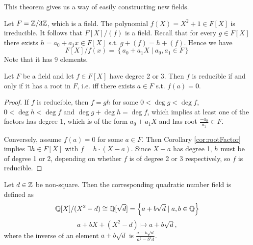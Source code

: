 This theorem gives us a way of easily constructing new fields.
\begin{example}
  Let $F=\mathbb Z/3\mathbb Z$, which is a field. The polynomial $f(X)=X^2+1\in F[X]$ is
  irreducible. It follows that $F[X]/(f)$ is a field. Recall that for every $g\in F[X]$
  there exists $h=a_0+a_1x\in F[X]$ s.t. $g+(f)=h+(f)$. Hence we have
  \[F[X]/f(x) = \left\{ a_0+a_1X \mid a_0,a_1\in F \right\}\]
  Note that it has 9 elements.
\end{example}
\begin{theorem}
  Let $F$ be a field and let $f\in F[X]$ have degree 2 or 3. Then $f$ is reducible if and
  only if it has a root in $F$, i.e. iff there exists $a\in F$ s.t. $f(a)=0$.
  \label{thm:deg2o3Root}
\end{theorem}
\begin{proof}
  If $f$ is reducible, then $f=gh$ for some $0<\deg g<\deg f$, $0<\deg h<\deg f$ and
  $\deg g + \deg h = \deg f$, which implies at least one of the factors has degree 1,
  which is of the form $a_0+a_1X$ and has root $\frac{-a_0}{a_1}\in F$.

  Conversely, assume $f(a)=0$ for some $a\in F$. Then Corollary \ref{cor:rootFactor} implies $\exists h\in F[X]$ with $f=h\cdot(X-a)$. Since $X-a$ has degree 1, $h$ must be of degree 1 or 2, depending on whether $f$ is of degree 2 or 3 respectively, so $f$ is reducible. 
\end{proof}


\begin{example}
  Let $d\in \mathbb Z$ be non-square. Then the corresponding quadratic number field is defined as
  \[\mathbb Q[X]/(X^2-d) \cong \mathbb Q[\sqrt{d}]=\left\{ a+b\sqrt{d} \mid a,b\in \mathbb Q \right\}\]
  \[a+bX+(X^2-d) \mapsto a+b\sqrt{d},\]
  where the inverse of an element $a+b\sqrt{d}$ is $\frac{a-b\sqrt{d}}{a^2-b^2d}$.
\end{example}
